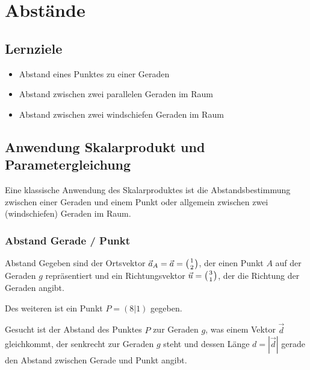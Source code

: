 \section{Abstände}

\subsection*{Lernziele}
\begin{itemize}
\item Abstand eines Punktes zu einer Geraden
\item Abstand zwischen zwei parallelen Geraden im Raum
\item Abstand zwischen zwei windschiefen Geraden im Raum
\end{itemize}

\newpage

\subsection{Anwendung Skalarprodukt und Parametergleichung}

Eine klassische Anwendung des Skalarproduktes ist die
Abstandsbestimmung zwischen einer Geraden und einem Punkt oder
allgemein zwischen zwei (windschiefen) Geraden im Raum.
\newpage

\subsubsection{Abstand Gerade / Punkt}

\begin{beispiel}{Abstand}{}
Gegeben sind der Ortsvektor $\vec{a}_A=\vec{a} = \left(1 \atop 2\right)$, der
einen Punkt $A$ auf der
Geraden $g$ repräsentiert und ein Richtungsvektor
$\vec{u}=\left(3\atop 1\right)$, der
die Richtung der Geraden angibt.

Des weiteren ist ein Punkt $P=(8|1)$ gegeben.

Gesucht ist der Abstand des Punktes $P$ zur Geraden $g$, was einem Vektor
$\vec{d}$ gleichkommt, der senkrecht zur Geraden $g$ steht und dessen Länge
$d=|\vec{d}|$ gerade den Abstand zwischen Gerade und Punkt angibt.
\end{beispiel}


